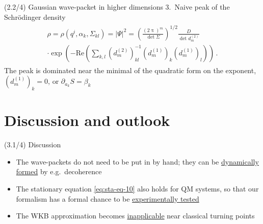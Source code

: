 \documentclass[mathserif]{beamer}
\newcommand{\rbr}[1]{{\left(#1\right)}}
\newcommand{\vbr}[1]{{\left|#1\right|}}
\newcommand{\rfun}[2]{#1\mathopen{}\left(#2\right)\mathclose{}}
\begin{document}
\begin{frame}{(2.2/4) Gaussian wave-packet in higher dimensions}%
{3.\ Naive peak of the Schr\"odinger density}
\begin{align}
    \begin{split}
    \rho = \rfun{\rho}{q^i, \alpha_k, \varSigma_{kl}} = \vbr{\varPsi}^2 
    =
    \rbr{\frac{\rbr{2\uppi}^{m}}{\det \varSigma}}^{1/2} \frac{D}{\det d^{(2)}_m}
    \\
    \cdot \rfun{\exp}{-\rfun{\mathrm{Re}}{\sum_{k,l} \rbr{d^{(2)}_m}^{-1}_{kl} \rbr{d^{(1)}_m}_{k} \rbr{d^{(1)}_m}_{l}}}\,. 
    \end{split}
\end{align}
The peak is dominated near the minimal of the quadratic form on the exponent, $\rbr{d_m^{(1)}}_{k} = 0$, or $\partial_{a_k}S = \beta_k$
\end{frame}

\section{Discussion and outlook}


\begin{frame}{(3.1/4) Discussion}
    \begin{itemize}
        \item
        The wave-packets do not need to be put in by hand; they can be 
        \underline{dynamically formed} by e.g.\ decoherence

        \item
        The stationary equation \eqref{eq:sta-eq-10} also holds for QM 
        systems, so that our formalism has a formal chance to be
        \underline{experimentally tested}

        \item
        The WKB approximation becomes \underline{inapplicable} near classical 
        turning points
    \end{itemize}
\end{frame}
\end{document}
